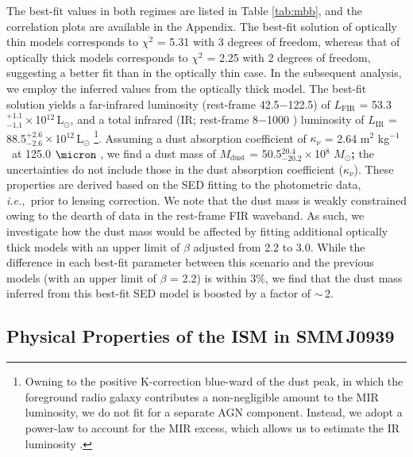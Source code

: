 \documentclass[iop, revtex4]{emulateapj}
\newcommand{\Msun}{\mbox{$M_{\odot}$}}
\newcommand{\Lsun}{\mbox{L$_{\odot}$}}
\newcommand{\eg}{{\sl e.g.,~}}
\newcommand{\ie}{{\sl i.e.,~}}
\newcommand{\pmOne}{\mbox{$^{-1}$}}
\begin{document}

The best-fit values in both regimes are listed in Table \ref{tab:mbb}, and the correlation plots are available in the Appendix. The best-fit solution of optically thin
models corresponds to $\chi^2$ = 5.31 with 3 degrees of freedom, whereas that of optically thick models
corresponds to $\chi^2$ = 2.25 with 2 degrees of freedom, suggesting a better fit than in the optically thin
case. In the subsequent analysis, we employ the inferred values from the optically thick model.
The best-fit solution yields a far-infrared luminosity (rest-frame 42.5$-$122.5\micron) of $L_\textrm{FIR}$ = 53.3$^{+1.1}_{-1.1}$\,$\times$\,10$^{12}$\,\Lsun, and a total infrared (IR; rest-frame 8$-$1000 \micron) luminosity of $L_\textrm{IR}$ = 88.5$^{+2.6}_{-2.6}$\,$\times$\,10$
^{12}$\,\Lsun
\footnote{
Owning to the positive K-correction blue-ward of the dust peak, in which
the foreground radio galaxy contributes a non-negligible amount to the MIR luminosity, we do not fit for a separate AGN component.
Instead, we adopt a power-law to account for the MIR excess, which allows us to estimate the IR
luminosity \citep[\eg][]{Casey12a, Riechers13a, Kirkpatrick15a}. }.
Assuming a dust absorption coefficient of $\kappa_{\nu}$ = 2.64\,\,m$^2$\,\,kg\pmOne\ at 125.0\,\,$
\micron$ \citep{Dunne03a}, we find a dust mass of $M_\textrm{dust}$ = 50.5$^{20.4}_{-20.2}\times$10$^8$\,\,\Msun{\bf ;} the uncertainties do not include those in the dust absorption coefficient ($\kappa_{\nu}$). These properties are derived based on the SED fitting to the photometric data, \ie prior
to lensing correction. We note that the dust mass is weakly constrained owing to the dearth of data in the rest-frame FIR waveband. As such, we investigate how the dust mass would be affected by fitting additional optically thick models with an upper limit of
 $\beta$ adjusted from 2.2 to 3.0. While the difference in each best-fit parameter between this scenario and the previous models (with an upper limit of $\beta$ = 2.2) is within 3\%, we find that the dust mass inferred from this best-fit SED model is boosted by a factor of $\sim$\,2.
\subsection{Physical Properties of the ISM in SMM\,J0939}
\end{document}
